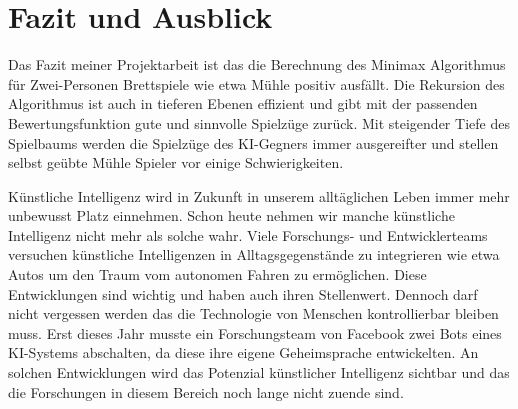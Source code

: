 \documentclass[oneside]{ausarbeitung}
\begin{document}
\chapter{Fazit und Ausblick}

Das Fazit meiner Projektarbeit ist das die Berechnung des Minimax Algorithmus für Zwei-Personen Brettspiele wie etwa Mühle positiv ausfällt. Die Rekursion des Algorithmus ist auch in tieferen Ebenen effizient und gibt mit der passenden Bewertungsfunktion gute und sinnvolle Spielzüge zurück. Mit steigender Tiefe des Spielbaums werden die Spielzüge des KI-Gegners immer ausgereifter und stellen selbst geübte Mühle Spieler vor einige Schwierigkeiten.

Künstliche Intelligenz wird in Zukunft in unserem alltäglichen Leben immer mehr unbewusst Platz einnehmen. Schon heute nehmen wir manche künstliche Intelligenz nicht mehr als solche wahr. Viele Forschungs- und Entwicklerteams versuchen künstliche Intelligenzen in Alltagsgegenstände zu integrieren wie etwa Autos um den Traum vom autonomen Fahren zu ermöglichen. Diese Entwicklungen sind wichtig und haben auch ihren Stellenwert. Dennoch darf nicht vergessen werden das die Technologie von Menschen kontrollierbar bleiben muss. Erst dieses Jahr musste ein Forschungsteam von Facebook zwei Bots eines KI-Systems abschalten, da diese ihre eigene Geheimsprache entwickelten. An solchen Entwicklungen wird das Potenzial künstlicher Intelligenz sichtbar und das die Forschungen in diesem Bereich noch lange nicht zuende sind.
\end{document}
